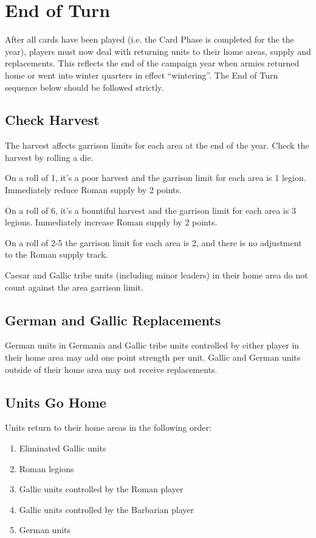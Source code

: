 \section{End of Turn}
\par
After all cards have been played (i.e. the Card Phase is completed for the the year), players must now deal with returning units to their home areas, supply and replacements. This reflects the end of the campaign year when armies returned home or went into winter quarters in effect “wintering”. The End of Turn sequence below should be followed strictly.

\subsection{Check Harvest}
\par
The harvest affects garrison limits for each area at the end of the year. Check the harvest by rolling a die.

On a roll of 1, it’s a poor harvest and the garrison limit for each area is 1 legion. Immediately reduce Roman supply by 2 points.

On a roll of 6, it’s a bountiful harvest and the garrison limit for each area is 3 legions. Immediately increase Roman supply by 2 points.

On a roll of 2-5 the garrison limit for each area is 2, and there is no adjustment to the Roman supply track.

Caesar and Gallic tribe units (including minor leaders) in their home area do not count against the area garrison limit.

\raggedbottom

\subsection{German and Gallic Replacements}
\par
German units in Germania and Gallic tribe units controlled by either player in their home area may add one point strength per unit. Gallic and German units outside of their home area may not receive replacements.

\begin{samepage}
\subsection{Units Go Home}
\par
Units return to their home areas in the following order:
\begin{enumerate}
  \setlength\itemsep{0em}
  \item {\small Eliminated Gallic units}
  \item {\small Roman legions}
  \item {\small Gallic units controlled by the Roman player}
  \item {\small Gallic units controlled by the Barbarian player}
  \item {\small German units}
\end{enumerate}
\end{samepage}

